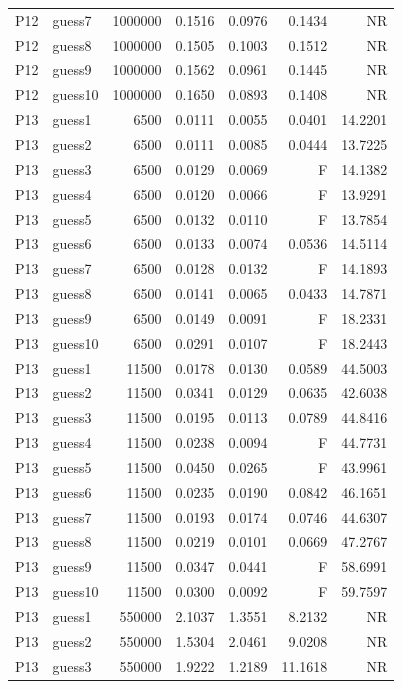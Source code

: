 {\begin{longtable}{llrrrrr}
P12 & guess7 & 1000000 & 0.1516 & 0.0976 & 0.1434 & NR \\
P12 & guess8 & 1000000 & 0.1505 & 0.1003 & 0.1512 & NR \\
P12 & guess9 & 1000000 & 0.1562 & 0.0961 & 0.1445 & NR \\
P12 & guess10 & 1000000 & 0.1650 & 0.0893 & 0.1408 & NR \\
P13 & guess1 & 6500 & 0.0111 & 0.0055 & 0.0401 & 14.2201 \\
P13 & guess2 & 6500 & 0.0111 & 0.0085 & 0.0444 & 13.7225 \\
P13 & guess3 & 6500 & 0.0129 & 0.0069 & F & 14.1382 \\
P13 & guess4 & 6500 & 0.0120 & 0.0066 & F & 13.9291 \\
P13 & guess5 & 6500 & 0.0132 & 0.0110 & F & 13.7854 \\
P13 & guess6 & 6500 & 0.0133 & 0.0074 & 0.0536 & 14.5114 \\
P13 & guess7 & 6500 & 0.0128 & 0.0132 & F & 14.1893 \\
P13 & guess8 & 6500 & 0.0141 & 0.0065 & 0.0433 & 14.7871 \\
P13 & guess9 & 6500 & 0.0149 & 0.0091 & F & 18.2331 \\
P13 & guess10 & 6500 & 0.0291 & 0.0107 & F & 18.2443 \\
P13 & guess1 & 11500 & 0.0178 & 0.0130 & 0.0589 & 44.5003 \\
P13 & guess2 & 11500 & 0.0341 & 0.0129 & 0.0635 & 42.6038 \\
P13 & guess3 & 11500 & 0.0195 & 0.0113 & 0.0789 & 44.8416 \\
P13 & guess4 & 11500 & 0.0238 & 0.0094 & F & 44.7731 \\
P13 & guess5 & 11500 & 0.0450 & 0.0265 & F & 43.9961 \\
P13 & guess6 & 11500 & 0.0235 & 0.0190 & 0.0842 & 46.1651 \\
P13 & guess7 & 11500 & 0.0193 & 0.0174 & 0.0746 & 44.6307 \\
P13 & guess8 & 11500 & 0.0219 & 0.0101 & 0.0669 & 47.2767 \\
P13 & guess9 & 11500 & 0.0347 & 0.0441 & F & 58.6991 \\
P13 & guess10 & 11500 & 0.0300 & 0.0092 & F & 59.7597 \\
P13 & guess1 & 550000 & 2.1037 & 1.3551 & 8.2132 & NR \\
P13 & guess2 & 550000 & 1.5304 & 2.0461 & 9.0208 & NR \\
P13 & guess3 & 550000 & 1.9222 & 1.2189 & 11.1618 & NR \\

\end{longtable}}
